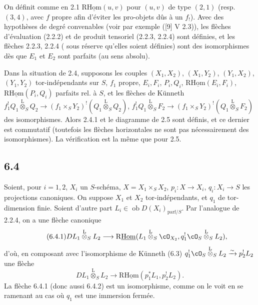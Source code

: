 On définit comme en 2.1 $\mathrm{R}\underline{\mathrm{Hom}}(u,v)$ pour $(u,v)$ de type $(2,1)$ (resp. $(3,4)$, avec $f$ propre afin d'éviter les pro-objets dûs à un $f_!$). Avec des hypothèses de degré convenables (voir par exemple ([9] V 2.3)), les flèches d'évaluation (2.2.2) et de produit tensoriel (2.2.3, 2.2.4) sont définies, et les flèches 
2.2.3, 2.2.4 (
sous réserve qu'elles soient définies) sont des isomorphismes dès que $E_1$ et $E_2$ sont parfaits (au sens absolu).

Dans la situation de 2.4, supposons les couples $(X_1,X_2)$, $(X_1,Y_2)$, $(Y_1,X_2)$, $(Y_1,Y_2)$ tor-indépendants sur $S$, $f_1$ propre, $E_i,F_i$, $P_i,Q_i$, $\mathrm{R}\underline{\mathrm{Hom}}(E_i,F_i)$, $\mathrm{R}\underline{\mathrm{Hom}}(P_i,Q_i)$ parfaits rel. à $S$, et les flèches de Künneth $f_1^!Q_1\overset{\mathrm{L}}{\otimes}_SQ_2\to(f_1\times_SY_2)^!(Q_1\overset{\mathrm{L}}{\otimes}_SQ_2)$, $f_1^!Q_1\overset{\mathrm{L}}{\otimes}_SF_2\to(f_1\times_SY_2)^!(Q_1\overset{\mathrm{L}}{\otimes}_SF_2)$ des isomorphismes. Alors 2.4.1 et le diagramme de 2.5 sont définis, et ce dernier est commutatif (toutefois les flèches horizontales ne sont pas nécessairement des isomorphismes). La vérification est la même que pour 2.5.

\subsection*{6.4}
Soient, pour $i=1,2$, $X_i$ un $S$-schéma, $X=X_1\times_SX_2$, $p_i:X\to X_i$, $q_i:X_i\to S$ les projections canoniques. On suppose $X_1$ et $X_2$ tor-indépendants, et $q_1$ de tor-dimension finie. Soient d'autre part $L_i\in\operatorname{ob}D(X_i)_{\mathrm{parf}/S}$. Par l'analogue de 2.2.4, on a une flèche canonique
\begin{equation}
\tag{6.4.1}
DL_1\overset{\mathrm{L}}{\otimes}_SL_2\longrightarrow \mathrm{R}\underline{\mathrm{Hom}}(L_1\overset{\mathrm{L}}{\otimes}_S\cO_{X_2},q_1^!\cO_S\overset{\mathrm{L}}{\otimes}_SL_2),
\end{equation}
d'où, en composant avec l'isomorphisme de Künneth (6.3) $q_1^!\cO_S\overset{\mathrm{L}}{\otimes}_SL_2\xrightarrow{\sim}p_2^!L_2$ une flèche
\begin{equation}
\tag{6.4.2}
DL_1\overset{\mathrm{L}}{\otimes}_SL_2\longrightarrow\mathrm{R}\underline{\mathrm{Hom}}(p_1^*L_1,p_2^!L_2).
\end{equation}
La flèche 6.4.1 (donc aussi 6.4.2) est un isomorphisme, comme on le voit en se ramenant au cas où $q_1$ est une immersion fermée.

